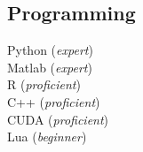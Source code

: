 \documentclass[letterpaper]{deedy-resume} %
\begin{document}
\begin{minipage}[t]{0.33\textwidth}
\subsection{Programming}


Python ({\it expert}) \\  Matlab ({\it expert}) \\R ({\it proficient})\\   C++ ({\it proficient}) \\  CUDA ({\it proficient}) \\ Lua ({\it beginner})
\sectionspace %


\end{minipage} %
\hfill
%
%
\end{document}
